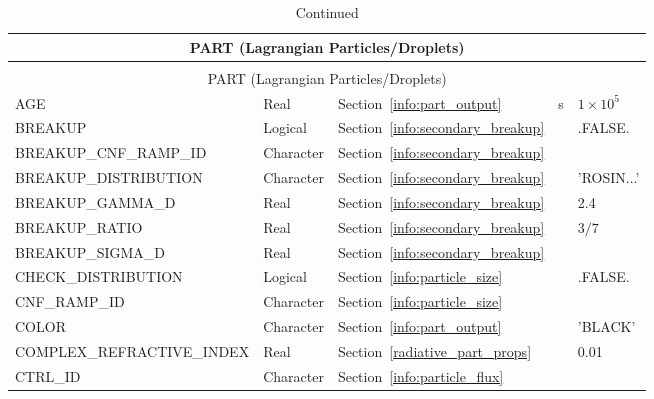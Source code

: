 \documentclass[11pt]{book}
\begin{document}
\begin{longtable}{@{\extracolsep{\fill}}|l|l|l|l|l|}
\caption[Lagrangian particles ({\ct PART} namelist group)]{For more information see Chapter~\ref{info:PART}.}
\label{tbl:PART} \\
\hline
\multicolumn{5}{|c|}{{\ct PART} (Lagrangian Particles/Droplets)} \\
\hline \hline
\endfirsthead
\caption[]{Continued} \\
\hline
\multicolumn{5}{|c|}{{\ct PART} (Lagrangian Particles/Droplets)} \\
\hline \hline
\endhead
{\ct AGE}                           & Real            & Section~\ref{info:part_output}          & s         & $1\times 10^5$ \\ \hline
{\ct BREAKUP}                       & Logical         & Section~\ref{info:secondary_breakup}    &           & {\ct .FALSE.} \\ \hline
{\ct BREAKUP\_CNF\_RAMP\_ID}        & Character       & Section~\ref{info:secondary_breakup}    &           &               \\ \hline
{\ct BREAKUP\_DISTRIBUTION}         & Character       & Section~\ref{info:secondary_breakup}    &           & {\ct 'ROSIN...'} \\ \hline
{\ct BREAKUP\_GAMMA\_D}             & Real            & Section~\ref{info:secondary_breakup}    &           & 2.4           \\ \hline
{\ct BREAKUP\_RATIO}                & Real            & Section~\ref{info:secondary_breakup}    &           & $3/7$         \\ \hline
{\ct BREAKUP\_SIGMA\_D}             & Real            & Section~\ref{info:secondary_breakup}    &           &               \\ \hline
{\ct CHECK\_DISTRIBUTION}           & Logical         & Section~\ref{info:particle_size}        &           & {\ct .FALSE.} \\ \hline
{\ct CNF\_RAMP\_ID}                 & Character       & Section~\ref{info:particle_size}        &           &               \\ \hline
{\ct COLOR}                         & Character       & Section~\ref{info:part_output}          &           & {\ct 'BLACK'} \\ \hline
{\ct COMPLEX\_REFRACTIVE\_INDEX}    & Real            & Section~\ref{radiative_part_props}      &           & 0.01          \\ \hline
{\ct CTRL\_ID}                      & Character       & Section~\ref{info:particle_flux}        &           &               \\ \hline

\end{longtable}
\end{document}
